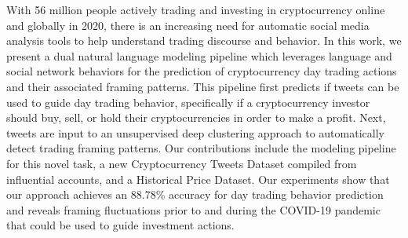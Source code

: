 With 56 million people actively trading and investing in cryptocurrency online and globally in 2020, there is an increasing need for automatic social media analysis tools to help understand trading discourse and behavior. In this work, we present a dual natural language modeling pipeline which leverages language and social network behaviors for the prediction of cryptocurrency day trading actions and their associated framing patterns. This pipeline first predicts if tweets can be used to guide day trading behavior, specifically if a cryptocurrency investor should buy, sell, or hold their cryptocurrencies in order to make a profit. Next, tweets are input to an unsupervised deep clustering approach to automatically detect trading framing patterns. Our contributions include the modeling pipeline for this novel task, a new Cryptocurrency Tweets Dataset compiled from influential accounts, and a Historical Price Dataset. Our experiments show that our approach achieves an 88.78\% accuracy for day trading behavior prediction and reveals framing fluctuations prior to and during the COVID-19 pandemic that could be used to guide investment actions.
